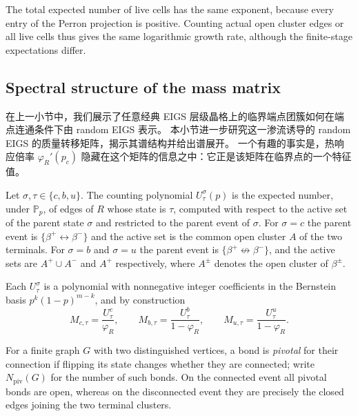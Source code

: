 The total expected number of live cells has the same exponent, because every entry of the Perron projection is positive.
Counting actual open cluster edges or all live cells thus gives the same logarithmic growth rate, although the finite-stage expectations differ.












\subsection{Spectral structure of the mass matrix}\label{sec:live-matrix}

在上一小节中，我们展示了任意经典 EIGS 层级晶格上的临界端点团簇如何在端点连通条件下由 random EIGS 表示。
本小节进一步研究这一渗流诱导的 random EIGS 的质量转移矩阵，揭示其谱结构并给出谱展开。
一个有趣的事实是，热响应倍率 $\varphi_R'(p_c)$ 隐藏在这个矩阵的信息之中：它正是该矩阵在临界点的一个特征值。

\begin{definition}\label{def:counting-polynomials}
Let $\sigma,\tau\in\{c,b,u\}$.
The counting polynomial $U^{\sigma}_{\tau}(p)$ is the expected number, under $\mathbb P_p$, of edges of $R$ whose state is $\tau$, computed with respect to the active set of the parent state $\sigma$ and restricted to the parent event of $\sigma$.
For $\sigma=c$ the parent event is $\{\beta^+\leftrightarrow\beta^-\}$ and the active set is the common open cluster $A$ of the two terminals.
For $\sigma=b$ and $\sigma=u$ the parent event is $\{\beta^+\nleftrightarrow\beta^-\}$, and the active sets are $A^{+}\cup A^{-}$ and $A^{+}$ respectively, where $A^{\pm}$ denotes the open cluster of $\beta^{\pm}$.
\end{definition}

Each $U^{\sigma}_{\tau}$ is a polynomial with nonnegative integer coefficients in the Bernstein basis $p^{k}(1-p)^{m-k}$, and by construction
\[
   M_{c,\tau}=\frac{U^{c}_{\tau}}{\varphi_R},
   \qquad
   M_{b,\tau}=\frac{U^{b}_{\tau}}{1-\varphi_R},
   \qquad
   M_{u,\tau}=\frac{U^{u}_{\tau}}{1-\varphi_R}.
\]

For a finite graph $G$ with two distinguished vertices, a bond is \emph{pivotal} for their connection if flipping its state changes whether they are connected; write $N_{\mathrm{piv}}(G)$ for the number of such bonds.
On the connected event all pivotal bonds are open, whereas on the disconnected event they are precisely the closed edges joining the two terminal clusters.

